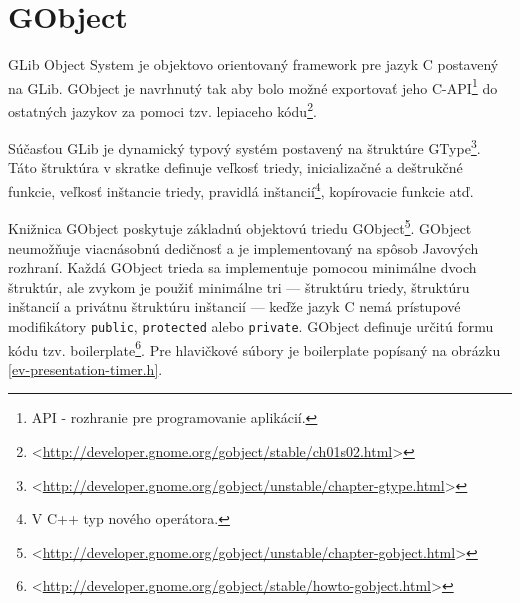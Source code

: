 \documentclass[12pt,oneside,final]{fithesis2}
\begin{document}
\section{GObject}
GLib Object System je objektovo orientovaný framework pre jazyk C postavený na GLib. GObject je navrhnutý tak aby bolo možné exportovať jeho C-API\footnote{API - rozhranie pre programovanie aplikácií.} do ostatných jazykov za pomoci tzv. lepiaceho kódu\footnote{<\url{http://developer.gnome.org/gobject/stable/ch01s02.html}>}.

Súčasťou GLib je dynamický typový systém postavený na štruktúre GType\footnote{<\url{http://developer.gnome.org/gobject/unstable/chapter-gtype.html}>}. Táto štruktúra v skratke definuje veľkosť triedy, inicializačné a deštrukčné funkcie, veľkosť inštancie triedy, pravidlá inštancií\footnote{V C++ typ nového operátora.}, kopírovacie funkcie atď.

Knižnica GObject poskytuje základnú objektovú triedu GObject\footnote{<\url{http://developer.gnome.org/gobject/unstable/chapter-gobject.html}>}. GObject neumožňuje viacnásobnú dedičnosť a je implementovaný na spôsob Javových rozhraní. Každá GObject trieda sa implementuje pomocou minimálne dvoch štruktúr, ale zvykom je použiť minimálne tri --- štruktúru triedy, štruktúru inštancií a privátnu štruktúru inštancií --- keďže jazyk C nemá prístupové modifikátory \verb|public|, \verb|protected| alebo \verb|private|. GObject definuje určitú formu kódu tzv. boilerplate\footnote{<\url{http://developer.gnome.org/gobject/stable/howto-gobject.html}>}.
Pre hlavičkové súbory je boilerplate popísaný na obrázku \ref{ev-presentation-timer.h}.
\end{document}
